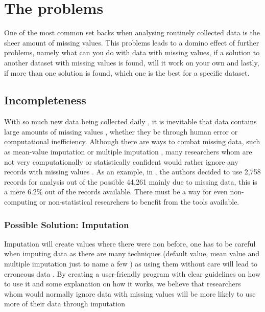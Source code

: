\documentclass{IEEEconf}
\begin{document}
	\section{The problems} %
	\label{sec:the_problems}
	One of the most common set backs when analysing routinely collected data is the sheer amount of missing values. This problems leads to a domino effect of further problems, namely what can you do with data with missing values, if a solution to another dataset with missing values is found, will it work on your own and lastly, if more than one solution is found, which one is the best for a specific dataset. 
		\subsection{Incompleteness} %
		\label{sub:incompleteness}
			With so much new data being collected daily \cite{bigData}, it is inevitable that data contains large amounts of missing values \cite{missing1}, whether they be through human error or computational inefficiency. Although there are ways to combat missing data, such as mean-value imputation or multiple imputation \cite{missing1,missing2,missing3}, many researchers whom are not very computationally or statistically confident would rather ignore any records with missing values \cite{epi1,ep2,ep3,ep4,ep5}. As an example, in \cite{epi1}, the authors decided to use 2,758 records for analysis out of the possible 44,261 mainly due to missing data, this is a mere 6.2\% out of the records available. There must be a way for even non-computing or non-statistical researchers to benefit from the tools available. 
			\subsubsection{Possible Solution: Imputation} %
			\label{sub:possible_solution}
				Imputation will create values where there were non before, one has to be careful when imputing data as there are many techniques (default value, mean value and multiple imputation just to name a few \cite{gelman2007data}) as using them without care will lead to erroneous data \cite{careful}. By creating a user-friendly program with clear guidelines on how to use it and some explanation on how it works, we believe that researchers whom would normally ignore data with missing values will be more likely to use more of their data through imputation
\end{document}
